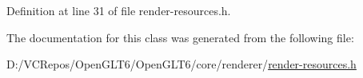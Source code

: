 Definition at line 31 of file render-\/resources.\+h.



The documentation for this class was generated from the following file\+:\begin{DoxyCompactItemize}
\item 
D\+:/\+V\+C\+Repos/\+Open\+G\+L\+T6/\+Open\+G\+L\+T6/core/renderer/\mbox{\hyperlink{render-resources_8h}{render-\/resources.\+h}}\end{DoxyCompactItemize}
